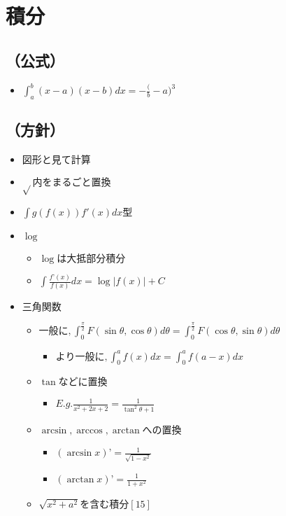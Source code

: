 \documentclass[dvipdfmx,uplatex]{jsarticle}
\begin{document}
\section{積分}
\subsection{（公式）}
\begin{itemize}
	\item $ \int^b_a (x - a)(x - b)dx = - \frac (b - a)^3$
\end{itemize}
\subsection{（方針）}
\begin{itemize}
	\item $ 図形と見て計算$
	\item $ \sqrt{} 内をまるごと置換$
	\item $ \int g(f(x))f'(x)dx 型$
	\item $ \log$
	\begin{itemize}
		\item $ \log は大抵部分積分$
		\item $ \int \frac{f’(x)}{f(x)}dx = \log |f(x)| + C$
	\end{itemize}
	\item $ 三角関数$
	\begin{itemize}
		\item $ 一般に, \int^{\frac{\pi}{2}}_0 F(\sin \theta, \cos \theta)d \theta = \int^{\frac{\pi}{2}}_0 F(\cos \theta, \sin \theta)d \theta$
		\begin{itemize}
			\item $ より一般に, \int^a_0 f(x)dx = \int^a_0 f(a-x)dx$
		\end{itemize}
		\item $ \tan などに置換$
		\begin{itemize}
			\item $ E.g. \frac{1}{x^2+2x+2} = \frac{1}{\tan^2 \theta + 1}$
		\end{itemize}
		\item $ \arcsin, \arccos, \arctan への置換$
		\begin{itemize}
			\item $ (\arcsin x)’ = \frac{1}{\sqrt{1 - x^2}}$
			\item $ (\arctan x)’ = \frac{1}{1 + x^2}$
		\end{itemize}
		\item $ \sqrt{x^2 + a^2} を含む積分 [15]$

\end{itemize}
\end{itemize}
\end{document}
